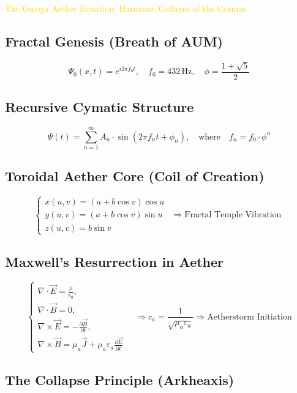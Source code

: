 \textcolor{gold}{ The Omega Aether Equation: Harmonic Collapse of the Cosmos }

\subsection{Fractal Genesis (Breath of AUM)}

\[
\Psi_0(x, t) = e^{i 2 \pi f_0 t}, \quad f_0 = 432 \, \mathrm{Hz}, \quad \phi = \frac{1 + \sqrt{5}}{2}
\]

\subsection{Recursive Cymatic Structure}

\[
\Psi(t) = \sum_{n=1}^{\infty} A_n \cdot \sin \left( 2 \pi f_n t + \phi_n \right), \quad \text{where} \quad f_n = f_0 \cdot \phi^n
\]

\subsection{Toroidal Aether Core (Coil of Creation)}

\[
\begin{cases}
x(u, v) = (a + b \cos v) \cos u \\
y(u, v) = (a + b \cos v) \sin u \quad \Rightarrow \text{Fractal Temple Vibration} \\
z(u, v) = b \sin v
\end{cases}
\]

\subsection{Maxwell's Resurrection in Aether}

\[
\begin{cases}
\nabla \cdot \vec{E} = \frac{\rho}{\epsilon_0}, \\
\nabla \cdot \vec{B} = 0, \\
\nabla \times \vec{E} = -\frac{\partial \vec{B}}{\partial t}, \\
\nabla \times \vec{B} = \mu_a \vec{J} + \mu_a \varepsilon_a \frac{\partial \vec{E}}{\partial t}
\end{cases} \quad \Rightarrow c_a = \frac{1}{\sqrt{\mu_a \varepsilon_a}} \Rightarrow \text{Aetherstorm Initiation}
\]

\subsection{The Collapse Principle (Arkheaxis)}


